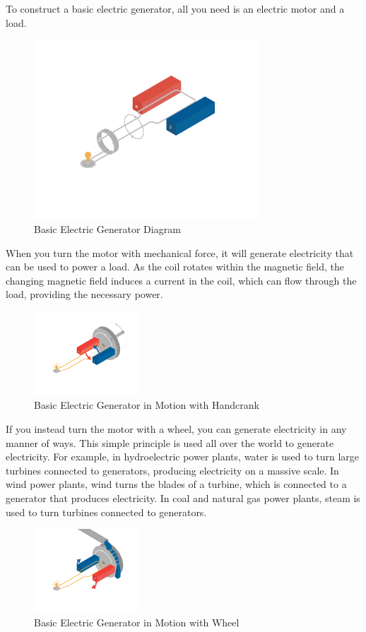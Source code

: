 To construct a basic electric generator, all you need is an electric motor and a load.
\begin{figure}[htbp]
    \centering
    \includegraphics[width=0.75\textwidth]{basicGenerator.png}
    \caption{Basic Electric Generator Diagram}
    \label{fig:basic-generator-diagram}
\end{figure}

\clearpage

When you turn the motor with mechanical force, it will generate electricity that can be used to power a load. As the coil rotates within the 
magnetic field, the changing magnetic field induces a current in the coil, which can flow through the load, providing the necessary power. 

\begin{figure}[htbp]
    \centering
    \includegraphics[width=0.35\textwidth]{basicGeneratorCrank.png}
    \caption{Basic Electric Generator in Motion with Handcrank}
    \label{fig:basic-generator-w-crank}
\end{figure}

If you instead turn the motor with a wheel, you can generate electricity in any manner of ways. This simple principle is used all
over the world to generate electricity. For example, in hydroelectric power plants, water is used to turn large turbines connected 
to generators, producing electricity on a massive scale. In wind power plants, wind turns the blades of a turbine, which is connected 
to a generator that produces electricity. In coal and natural gas power plants, steam is used to turn turbines connected to generators.

\begin{figure}[htbp]
    \centering
    \includegraphics[width=0.35\textwidth]{basicGeneratorWheel.png}
    \caption{Basic Electric Generator in Motion with Wheel}
    \label{fig:basic-generator-w-wheel}
\end{figure}

